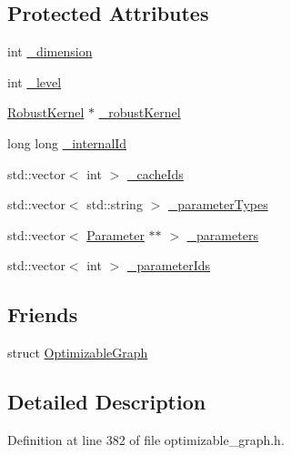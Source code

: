 \subsection*{Protected Attributes}
\begin{DoxyCompactItemize}
\item 
int \hyperlink{classg2o_1_1OptimizableGraph_1_1Edge_a4e651628f7657c81d0e4c1b26caaa6aa}{\+\_\+dimension}
\item 
int \hyperlink{classg2o_1_1OptimizableGraph_1_1Edge_a57132078028dd0455aef141e62e07db9}{\+\_\+level}
\item 
\hyperlink{classg2o_1_1RobustKernel}{Robust\+Kernel} $\ast$ \hyperlink{classg2o_1_1OptimizableGraph_1_1Edge_a6b942321f9e4e82051d529efb255af35}{\+\_\+robust\+Kernel}
\item 
long long \hyperlink{classg2o_1_1OptimizableGraph_1_1Edge_abdfc449ed57479d90d2e57a8bc0bea12}{\+\_\+internal\+Id}
\item 
std\+::vector$<$ int $>$ \hyperlink{classg2o_1_1OptimizableGraph_1_1Edge_a56bddaadd70570dbd96e8deed3d4b34c}{\+\_\+cache\+Ids}
\item 
std\+::vector$<$ std\+::string $>$ \hyperlink{classg2o_1_1OptimizableGraph_1_1Edge_a08666609850240956c64c95ae5ae0f2c}{\+\_\+parameter\+Types}
\item 
std\+::vector$<$ \hyperlink{classg2o_1_1Parameter}{Parameter} $\ast$$\ast$ $>$ \hyperlink{classg2o_1_1OptimizableGraph_1_1Edge_a41c4d6a404d0b057d37fac43edec40ed}{\+\_\+parameters}
\item 
std\+::vector$<$ int $>$ \hyperlink{classg2o_1_1OptimizableGraph_1_1Edge_a33a35663ba5b096cb6e6078014bd6f17}{\+\_\+parameter\+Ids}
\end{DoxyCompactItemize}
\subsection*{Friends}
\begin{DoxyCompactItemize}
\item 
struct \hyperlink{classg2o_1_1OptimizableGraph_1_1Edge_a45d35331ee3deca38c26d1efb6b961ae}{Optimizable\+Graph}
\end{DoxyCompactItemize}


\subsection{Detailed Description}


Definition at line 382 of file optimizable\+\_\+graph.\+h.



